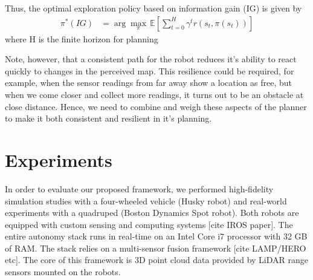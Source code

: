\documentclass[letterpaper]{article} %
\newcommand{\ph}[1]{{\textbf{#1}:}} %
\begin{document}
Thus, the optimal exploration policy based on information gain (IG) is given by
\begin{align}
  \pi^*(IG) &= \arg\max_\pi \, \mathbb{E} \left[ \sum_{t=0}^{H} \gamma^t r(s_t, \pi(s_t)) \right]
  \label{eq:ig_policy}
\end{align}
where H is the finite horizon for planning


Note, however, that a consistent path for the robot reduces it’s ability to react quickly to changes in the perceived map. This resilience could be required, for example, when the sensor readings from far away show a location as free, but when we come closer and collect more readings, it turns out to be an obstacle at close distance. Hence, we need to combine and weigh these aspects of the planner to make it both consistent and resilient in it’s planning.


\section{Experiments}\label{sec:exp_results}
In order to evaluate our proposed framework, we performed high-fidelity simulation studies with a four-wheeled vehicle (Husky robot) and real-world experiments with a quadruped (Boston Dynamics Spot robot). Both robots are equipped with custom sensing and computing systems [cite IROS paper]. The entire autonomy stack runs in real-time on an Intel Core i7 processor with 32 GB of RAM. The stack relies on a multi-sensor fusion framework [cite LAMP/HERO etc]. The core of this framework is 3D point cloud data provided by LiDAR range sensors mounted on the robots.

\end{document}
